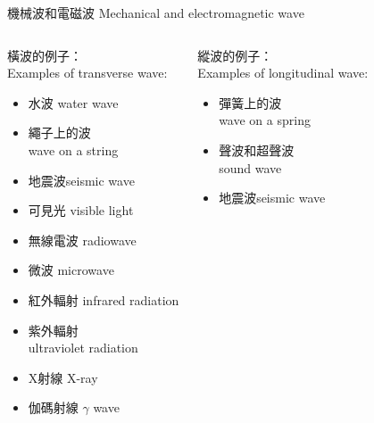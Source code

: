\documentclass[beamer=true]{standalone}
\begin{document}
\begin{frame}{機械波和電磁波 Mechanical and electromagnetic wave}
    \begin{columns}
        \begin{exampleblock}
            {橫波的例子：\\Examples of transverse wave:}
            \begin{itemize}
                \item 水波 water wave
                \item 繩子上的波 \\wave on a string
                \item 地震波seismic wave
                \item 可見光 visible light
                \item 無線電波 radiowave
                \item 微波 microwave
                \item 紅外輻射 infrared radiation
                \item 紫外輻射 \\ultraviolet radiation
                \item X射線 X-ray
                \item 伽碼射線 $\gamma$ wave
            \end{itemize}
        \end{exampleblock}
        \begin{exampleblock}
            {縱波的例子：\\Examples of longitudinal wave:}
            \begin{itemize}
                \item 彈簧上的波\\wave on a spring
                \item 聲波和超聲波\\sound wave
                \item 地震波seismic wave
            \end{itemize}
        \end{exampleblock}
    \end{columns}
\end{frame}
\end{document}
